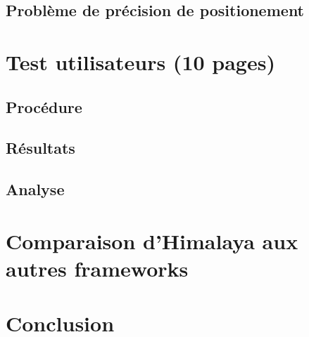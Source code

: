 	\section{Problème de précision de positionement}
\chapter{Test utilisateurs (10 pages) }
	\section{Procédure}
	\section{Résultats}
	\section{Analyse}
\chapter{Comparaison d'Himalaya aux autres frameworks}
\chapter{Conclusion}
